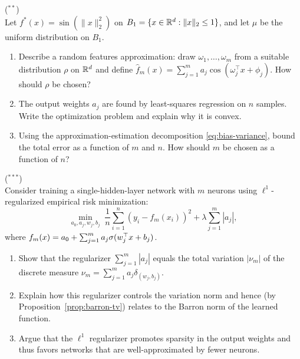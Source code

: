 \documentclass[11pt,a4paper]{article}
\begin{document}
\begin{exercise}
\textnormal{(\({}^{**}\))} \\
Let $f^*(x) = \sin(\|x\|_2^2)$ on $B_1 = \{x \in \mathbb{R}^d : \|x\|_2 \le 1\}$,
and let $\mu$ be the uniform distribution on $B_1$.
\begin{enumerate}[label=(\alph*)]
  \item Describe a random features approximation: draw $\omega_1, \ldots,
    \omega_m$ from a suitable distribution $\rho$ on $\mathbb{R}^d$ and define
    $\hat{f}_m(x) = \sum_{j=1}^m a_j \cos(\omega_j^\top x + \phi_j)$.
    How should $\rho$ be chosen?
  \item The output weights $a_j$ are found by least-squares regression
    on $n$ samples.  Write the optimization problem and explain why it
    is convex.
  \item Using the approximation-estimation decomposition
    \eqref{eq:bias-variance}, bound the total error as a function of
    $m$ and $n$.  How should $m$ be chosen as a function of $n$?
\end{enumerate}
\end{exercise}

\begin{exercise}
\textnormal{(\({}^{***}\))} \\
Consider training a single-hidden-layer network with $m$ neurons using
$\ell^1$-regularized empirical risk minimization:
\[
  \min_{a_0, a_j, w_j, b_j} \;
  \frac{1}{n} \sum_{i=1}^n (y_i - f_m(x_i))^2
  + \lambda \sum_{j=1}^m |a_j|,
\]
where $f_m(x) = a_0 + \sum_{j=1}^m a_j \sigma(w_j^\top x + b_j)$.
\begin{enumerate}[label=(\alph*)]
  \item Show that the regularizer $\sum_{j=1}^m |a_j|$ equals the total
    variation $|\nu_m|$ of the discrete measure
    $\nu_m = \sum_{j=1}^m a_j \delta_{(w_j, b_j)}$.
  \item Explain how this regularizer controls the variation norm and
    hence (by Proposition~\ref{prop:barron-tv}) relates to the Barron
    norm of the learned function.
  \item Argue that the $\ell^1$ regularizer promotes sparsity in the
    output weights and thus favors networks that are well-approximated
    by fewer neurons.
\end{enumerate}
\end{exercise}

\end{document}
